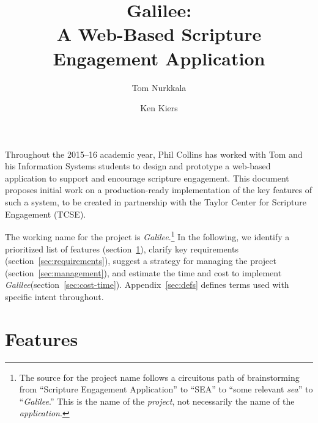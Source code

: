 \documentclass{article}
\title{Galilee:\\A Web-Based Scripture Engagement Application}
\author{Tom Nurkkala \and Ken Kiers}
\newcommand{\gal}{\emph{Galilee}}
\newcommand{\tcse}{TCSE}
\begin{document}
\maketitle

Throughout the 2015--16 academic year,
Phil Collins has worked with
Tom and his Information Systems students
to design and prototype
a web-based application
to support and encourage scripture engagement.
This document proposes initial work
on a production-ready implementation of
the key features of such a system,
to be created in partnership
with the Taylor Center for Scripture Engagement (\tcse).

The working name for the project
is \gal.\footnote{The source for the project name
  follows a circuitous path of brainstorming
  from ``Scripture Engagement Application''
  to ``SEA''
  to ``some relevant \emph{sea}''
  to ``\gal.''
  This is the name of the \emph{project},
  not necessarily the name of the \emph{application}.}
In the following, we
identify a prioritized list of features (section~\ref{sec:features}),
clarify key requirements (section~\ref{sec:requirements}),
suggest a strategy for managing the project (section~\ref{sec:management}),
and estimate the time and cost to implement \gal (section~\ref{sec:cost-time}).
Appendix~\ref{sec:defs} defines terms used with specific intent throughout.

\section{Features}
\label{sec:features}
\end{document}
